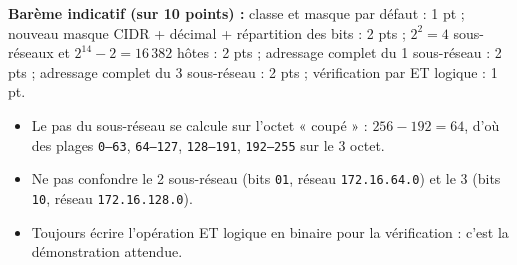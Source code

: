 \documentclass[11pt]{article}
\begin{document}
\begin{corrige}
\textbf{Barème indicatif (sur 10 points) :} classe et masque par défaut : 1 pt ; nouveau masque CIDR + décimal + répartition des bits : 2 pts ; $2^2 = 4$ sous-réseaux et $2^{14} - 2 = 16\,382$ hôtes : 2 pts ; adressage complet du 1 sous-réseau : 2 pts ; adressage complet du 3 sous-réseau : 2 pts ; vérification par ET logique : 1 pt.

\begin{attention}
\begin{itemize}
    \item Le pas du sous-réseau se calcule sur l'octet « coupé » : $256 - 192 = 64$, d'où des plages \texttt{0--63}, \texttt{64--127}, \texttt{128--191}, \texttt{192--255} sur le 3 octet.
    \item Ne pas confondre le 2 sous-réseau (bits \texttt{01}, réseau \texttt{172.16.64.0}) et le 3 (bits \texttt{10}, réseau \texttt{172.16.128.0}).
    \item Toujours écrire l'opération ET logique en binaire pour la vérification : c'est la démonstration attendue.
\end{itemize}
\end{attention}
\end{corrige}
\end{document}
